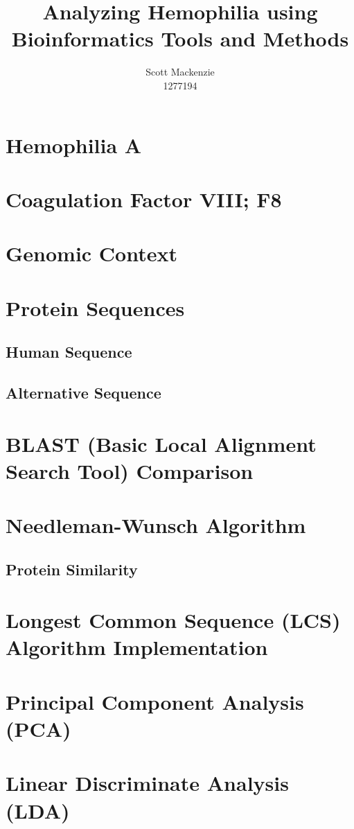 \documentclass[]{report}
\title{Analyzing Hemophilia using Bioinformatics Tools and Methods}
\author{Scott Mackenzie \\1277194}
\begin{document}
\maketitle

\section{Hemophilia A}

\section{Coagulation Factor VIII; F8}

\section{Genomic Context}

\section{Protein Sequences}

\subsection{Human Sequence}

\subsection{Alternative Sequence}

\section{BLAST (Basic Local Alignment Search Tool) Comparison}

\section{Needleman-Wunsch Algorithm}

\subsection{Protein Similarity}

\section{Longest Common Sequence (LCS) Algorithm Implementation }

\section{Principal Component Analysis (PCA)}

\section{Linear Discriminate Analysis (LDA)}
\end{document}
